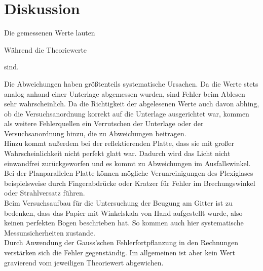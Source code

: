 \section{Diskussion}
\label{sec:Diskussion}

Die gemessenen Werte lauten


Während die Theoriewerte

sind. 


Die Abweichungen haben größtenteils systematische Ursachen. Da die Werte stets analog anhand einer Unterlage abgemessen wurden, sind Fehler beim Ablesen sehr wahrscheinlich.
Da die Richtigkeit der abgelesenen Werte auch davon abhing, ob die Versuchsanordnung korrekt auf die Unterlage ausgerichtet war, kommen als weitere Fehlerquellen ein Verrutschen
der Unterlage oder der Versuchsanordnung hinzu, die zu Abweichungen beitragen.\\
Hinzu kommt außerdem bei der reflektierenden Platte, dass sie mit großer Wahrscheinlichkeit nicht perfekt glatt war. Dadurch wird das Licht nicht einwandfrei zurückgeworfen
und es kommt zu Abweichungen im Ausfallswinkel. \\
Bei der Planparallelen Platte können mögliche Verunreinigungen des Plexiglases beispielsweise durch Fingerabdrücke oder Kratzer für Fehler im Brechungswinkel oder 
Strahlversatz führen. \\
Beim Versuchsaufbau für die Untersuchung der Beugung am Gitter ist zu bedenken, dass das Papier mit Winkelskala von Hand aufgestellt wurde, also keinen perfekten Bogen beschrieben 
hat. So kommen auch hier systematische Messunsicherheiten zustande.\\
Durch Anwendung der Gauss'schen Fehlerfortpflanzung in den Rechnungen verstärken sich die Fehler gegenständig. Im allgemeinen ist aber kein Wert gravierend vom jeweiligen 
Theoriewert abgewichen.